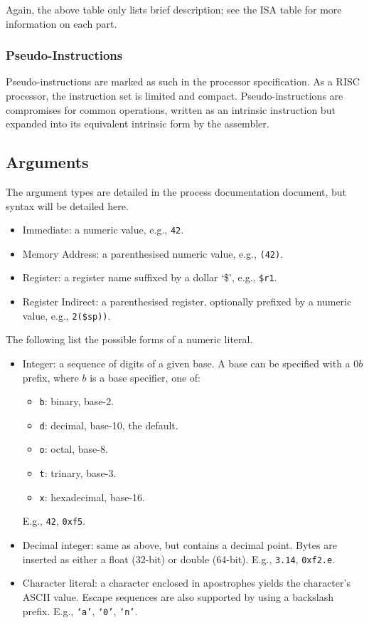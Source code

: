 \documentclass[10pt]{article}
\begin{document}
Again, the above table only lists brief description; see the ISA table for more information on each part.

\subsubsection{Pseudo-Instructions}

Pseudo-instructions are marked as such in the processor specification.
As a RISC processor, the instruction set is limited and compact.
Pseudo-instructions are compromises for common operations, written as an intrinsic instruction but expanded into its equivalent intrinsic form by the assembler.

\subsection{Arguments}

The argument types are detailed in the process documentation document, but syntax will be detailed here.
\begin{itemize}
    \item Immediate: a numeric value, e.g., \texttt{42}.
    \item Memory Address: a parenthesised numeric value, e.g., \texttt{(42)}.
    \item Register: a register name suffixed by a dollar `\$', e.g., \texttt{\$r1}.
    \item Register Indirect: a parenthesised register, optionally prefixed by a numeric value, e.g., \texttt{2(\$sp))}.
\end{itemize}

The following list the possible forms of a numeric literal.

\begin{itemize}
    \item Integer: a sequence of digits of a given base.
    A base can be specified with a 0\(b\) prefix, where \(b\) is a base specifier, one of:
    \begin{itemize}
        \item \texttt{b}: binary, base-2.
        \item \texttt{d}: decimal, base-10, the default.
        \item \texttt{o}: octal, base-8.
        \item \texttt{t}: trinary, base-3.
        \item \texttt{x}: hexadecimal, base-16.
    \end{itemize}
    E.g., \texttt{42}, \texttt{0xf5}.
    \item Decimal integer: same as above, but contains a decimal point.
    Bytes are inserted as either a float (32-bit) or double (64-bit).
    E.g., \texttt{3.14}, \texttt{0xf2.e}.
    \item Character literal: a character enclosed in apostrophes yields the character's ASCII value.
    Escape sequences are also supported by using a backslash prefix.
    E.g., \texttt{`a'}, \texttt{`0'}, \texttt{`n'}.
\end{itemize}
\end{document}
